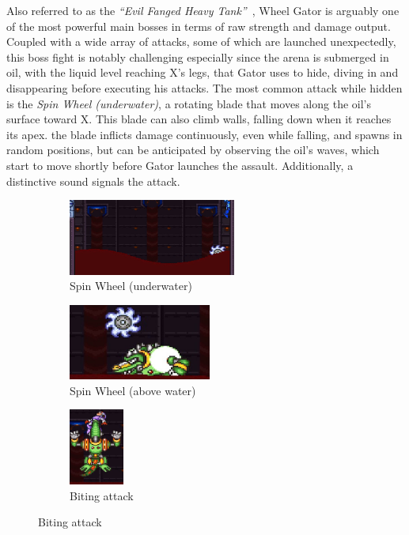 Also referred to as the \textit{``Evil Fanged Heavy Tank''}~\cite{book:MMX_Complete_art}, Wheel Gator is arguably one of the most powerful main bosses in terms of raw strength and damage output. Coupled with a wide array of attacks, some of which are launched unexpectedly, this boss fight is notably challenging especially since the arena is submerged in oil, with the liquid level reaching X's legs, that Gator uses to hide, diving in and disappearing before executing his attacks. The most common attack while hidden is the \emph{Spin Wheel (underwater)}, a rotating blade that moves along the oil's surface toward X. This blade can also climb walls, falling down when it reaches its apex. the blade inflicts damage continuously, even while falling, and spawns in random positions, but can be anticipated by observing the oil's waves, which start to move shortly before Gator launches the assault. Additionally, a distinctive sound signals the attack.\begin{figure}[htp]
	\centering
	\begin{subfigure}{\linewidth}
		\centering
		\includegraphics[height=2.5cm]{figures/X2/Wheel_gator/Gator_Spinning_wheel.png}
		\caption{Spin Wheel (underwater)}
	\end{subfigure}
	\begin{subfigure}{0.5\linewidth}
		\centering
		\includegraphics[height=2.5cm]{figures/X2/Wheel_gator/Gator_spinning_wheel_2.png}
		\caption{Spin Wheel (above water)}
	\end{subfigure}
	\begin{subfigure}{0.2\linewidth}
		\centering
		\includegraphics[height=2.5cm]{figures/X2/Wheel_gator/Gator_bite.png}
		\caption{Biting attack}
	\end{subfigure}
\end{figure}

